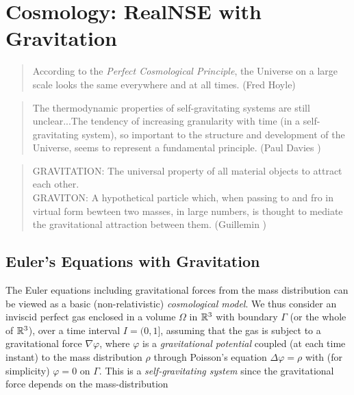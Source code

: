 \fi  %

\iffalse  %
\chapter{Cosmology: RealNSE with Gravitation}

\small
\begin{quote} According to the \emph{Perfect Cosmological Principle}, 
the Universe on a large scale looks the same everywhere and at all times.
(Fred Hoyle)
\end{quote}
\begin{quote} The thermodynamic properties of self-gravitating
systems are still unclear...The tendency of increasing granularity with time
(in a self-gravitating system), so important to the structure and development 
of the Universe, seems to represent a fundamental principle. 
(Paul Davies \cite{davies})
\end{quote}
\begin{quote} 
GRAVITATION: The universal property of all material objects
to attract each other.\\
GRAVITON: A hypothetical particle which, when passing
to and fro in virtual form bewteen two masses, in large numbers,
is thought to mediate the gravitational attraction between them.
(Guillemin \cite{guillemin})
\end{quote}
\normalsize

\normalsize

\section{Euler's Equations with Gravitation}

The Euler equations including gravitational forces from the mass distribution
can be viewed as a basic (non-relativistic) \emph{cosmological model}.  
We thus consider an inviscid perfect gas 
enclosed in a volume $\Omega$ in ${\mathbb{R}}^3$ with boundary $\Gamma$
(or the whole of ${\mathbb{R}}^3$), over a time interval $I=(0,1]$, assuming 
that the gas is subject to a gravitational force $\nabla\varphi$, where
$\varphi$ is a \emph{gravitational potential} 
coupled (at each time instant) to the mass distribution $\rho$  
through Poisson's equation $\Delta\varphi =\rho$
with (for simplicity) $\varphi =0$ on $\Gamma$. This is a 
\emph{self-gravitating system} since the gravitational force depends
on the mass-distribution  

